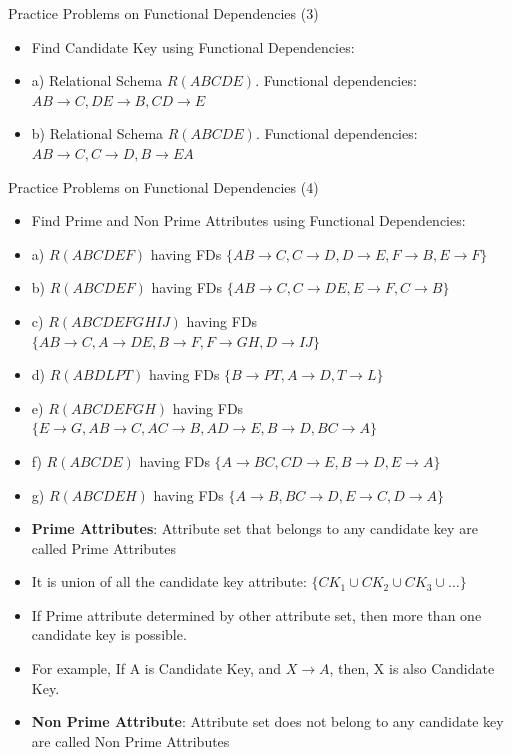 \documentclass[aspectratio=169, xcolor=dvipsnames]{beamer}
\begin{document}
\begin{frame}{Practice Problems on Functional Dependencies (3)}
    \begin{itemize}[<+->]
        \item Find Candidate Key using Functional Dependencies:
        \item a) Relational Schema $R(ABCDE)$. Functional dependencies: $AB \rightarrow C, DE \rightarrow B, CD \rightarrow E$
        \item b) Relational Schema $R(ABCDE)$. Functional dependencies: $AB \rightarrow C, C \rightarrow D, B \rightarrow EA$
    \end{itemize}
\end{frame}

\begin{frame}{Practice Problems on Functional Dependencies (4)}
    \begin{itemize}[<+->]
        \item Find Prime and Non Prime Attributes using Functional Dependencies:
        \item a) $R(ABCDEF)$ having FDs $\{AB \rightarrow C, C \rightarrow D, D \rightarrow E, F \rightarrow B, E \rightarrow F\}$
        \item b) $R(ABCDEF)$ having FDs $\{AB \rightarrow C, C \rightarrow DE, E \rightarrow F, C \rightarrow B\}$
        \item c) $R(ABCDEFGHIJ)$ having FDs $\{AB \rightarrow C, A \rightarrow DE, B \rightarrow F, F \rightarrow GH, D \rightarrow IJ\}$
        \item d) $R(ABDLPT)$ having FDs $\{B \rightarrow PT, A \rightarrow D, T \rightarrow L\}$
        \item e) $R(ABCDEFGH)$ having FDs $\{E \rightarrow G, AB \rightarrow C, AC \rightarrow B, AD \rightarrow E, B \rightarrow D, BC \rightarrow A\}$
        \item f) $R(ABCDE)$ having FDs $\{A \rightarrow BC, CD \rightarrow E, B \rightarrow D, E \rightarrow A\}$
        \item g) $R(ABCDEH)$ having FDs $\{A \rightarrow B, BC \rightarrow D, E \rightarrow C, D \rightarrow A\}$
        \item \textbf{Prime Attributes}: Attribute set that belongs to any candidate key are called Prime Attributes
        \item It is union of all the candidate key attribute: $\{CK_1 \cup CK_2 \cup CK_3 \cup \dots\}$
        \item If Prime attribute determined by other attribute set, then more than one candidate key is possible.
        \item For example, If A is Candidate Key, and $X \rightarrow A$, then, X is also Candidate Key.
        \item \textbf{Non Prime Attribute}: Attribute set does not belong to any candidate key are called Non Prime Attributes
    \end{itemize}
\end{frame}
\end{document}
